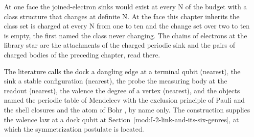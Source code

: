 At one face the joined-electron sinks would exist at every N of the budget with a class structure that changes at definite N. At the face this chapter inherits the class set is charged at every N from one to ten and the change set over two to ten is empty, the first named the class never changing. The chains of electrons at the library star are the attachments of the charged periodic sink and the pairs of charged bodies of the preceding chapter, read there.
\begin{chbridge}
The literature calls the dock a dangling edge at a terminal qubit (nearest), the sink a stable configuration (nearest), the probe the measuring body at the readout (nearest), the valence the degree of a vertex (nearest), and the objects named the periodic table of Mendeleev with the exclusion principle of Pauli and the shell closures \cite{Mendeleev1869,Pauli1925} and the atom of Bohr \cite{Bohr1913}, by name only. The construction supplies the valence law at a dock qubit at Section~\ref{mod:I-2-link-and-its-six-genres}, at which the symmetrization postulate is located.
\end{chbridge}
